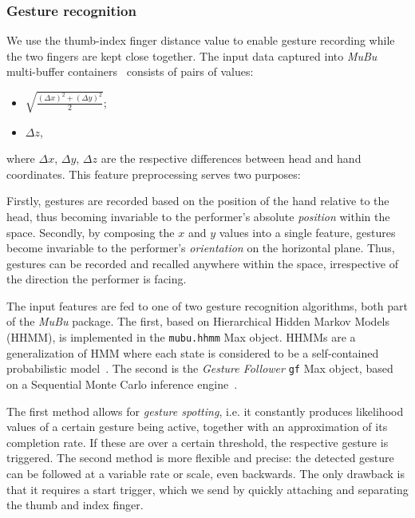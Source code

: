 \documentclass{nime-alternate}
\begin{document}


\subsubsection{Gesture recognition}

We use the thumb-index finger distance value to enable gesture recording while the two fingers are kept close together. The input data captured into \textit{MuBu} multi-buffer containers~\cite{mubu} consists of pairs of values:
\begin{itemize}
	\item $\sqrt{\frac{(\Delta x)^2 + (\Delta y)^2}{2}}$;
	\item $\Delta z$,
\end{itemize}
where $\Delta x$, $\Delta y$, $\Delta z$ are the respective differences between head and hand coordinates. This feature preprocessing serves two purposes:

Firstly, gestures are recorded based on the position of the hand relative to the head, thus becoming invariable to the performer's absolute \textit{position} within the space. Secondly, by composing the $x$ and $y$ values into a single feature, gestures become invariable to the performer's \textit{orientation} on the horizontal plane. Thus, gestures can be recorded and recalled anywhere within the space, irrespective of the direction the performer is facing.

The input features are fed to one of two gesture recognition algorithms, both part of the \textit{MuBu} package. The first, based on Hierarchical Hidden Markov Models (HHMM), is implemented in the \texttt{mubu.hhmm} Max object. HHMMs are a generalization of HMM where each state is considered to be a self-contained probabilistic model~\cite{probabilisticmodels,hhmm}. The second is the \textit{Gesture Follower} \texttt{gf} Max object, based on a Sequential Monte Carlo inference engine~\cite{caramiaux2015adaptive}. 

The first method allows for \textit{gesture spotting}, i.e. it constantly produces likelihood values of a certain gesture being active, together with an approximation of its completion rate. If these are over a certain threshold, the respective gesture is triggered. The second method is more flexible and precise: the detected gesture can be followed at a variable rate or scale, even backwards. The only drawback is that it requires a start trigger, which we send by quickly attaching and separating the thumb and index finger.
\end{document}

